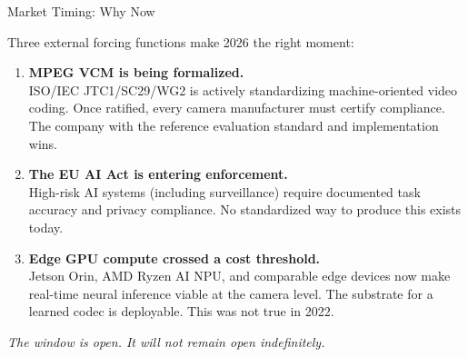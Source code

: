 \documentclass[aspectratio=169, professionalfonts, 10pt]{beamer}
\begin{document}
\begin{frame}{Market Timing: Why Now}

  Three external forcing functions make 2026 the right moment:

  \bigskip
  \begin{enumerate}
    \item \textbf{MPEG VCM is being formalized.} \\
          ISO/IEC JTC1/SC29/WG2 is actively standardizing machine-oriented video coding. Once ratified, every camera manufacturer must certify compliance. The company with the reference evaluation standard and implementation wins.

    \bigskip
    \item \textbf{The EU AI Act is entering enforcement.} \\
          High-risk AI systems (including surveillance) require documented task accuracy and privacy compliance. No standardized way to produce this exists today.

    \bigskip
    \item \textbf{Edge GPU compute crossed a cost threshold.} \\
          Jetson Orin, AMD Ryzen AI NPU, and comparable edge devices now make real-time neural inference viable at the camera level. The substrate for a learned codec is deployable. This was not true in 2022.
  \end{enumerate}

  \vspace{0.5em}
  \begin{center}
    \textit{The window is open. It will not remain open indefinitely.}
  \end{center}
\end{frame}
\end{document}

